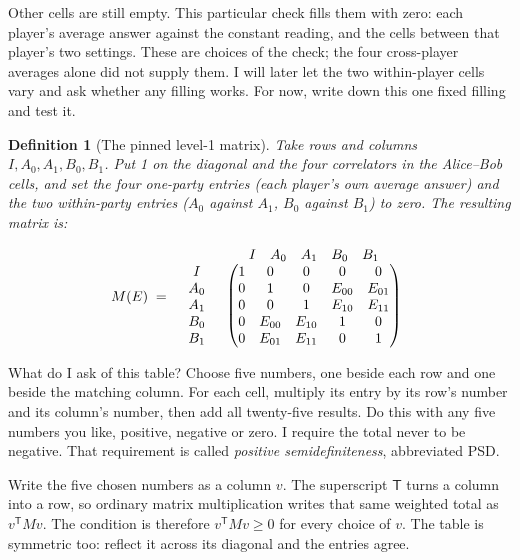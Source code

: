 \documentclass[11pt,twoside]{article}
\theoremstyle{thielethm}
\theoremstyle{thieledef}
\newtheorem{definition}{Definition}[section]
\theoremstyle{thieledef}
\theoremstyle{thieledef}
\theoremstyle{thielethm}
\theoremstyle{thieleobs}
\theoremstyle{thielethm}
\begin{document}
Other cells are still empty. This particular check fills them with zero:
each player's average answer against the constant reading, and the cells
between that player's two settings. These are choices of the check; the
four cross-player averages alone did not supply them. I will later let the
two within-player cells vary and ask whether any filling works. For now,
write down this one fixed filling and test it.

\begin{definition}[The pinned level-1 matrix]
Take rows and columns $I,A_0,A_1,B_0,B_1$. Put 1 on the diagonal and the four correlators in
the Alice--Bob cells, and set the four one-party entries (each player's own average answer) and
the two within-party entries ($A_0$ against $A_1$, $B_0$ against $B_1$) to zero. The resulting
matrix is:
\end{definition}

\[
M(E) \;=\;
\begin{array}{c@{\quad}c}
 & \begin{array}{ccccc} I & A_0 & A_1 & B_0 & B_1 \end{array} \\
\begin{array}{c} I \\ A_0 \\ A_1 \\ B_0 \\ B_1 \end{array} &
\begin{pmatrix}
1 & 0 & 0 & 0 & 0 \\
0 & 1 & 0 & E_{00} & E_{01} \\
0 & 0 & 1 & E_{10} & E_{11} \\
0 & E_{00} & E_{10} & 1 & 0 \\
0 & E_{01} & E_{11} & 0 & 1
\end{pmatrix}
\end{array}
\]

What do I ask of this table? Choose five numbers, one beside each row and
one beside the matching column. For each cell, multiply its entry by its row's
number and its column's number, then add all twenty-five results. Do this
with any five numbers you like, positive, negative or zero. I require the
total never to be negative. That requirement is called \emph{positive
semidefiniteness}, abbreviated PSD.

Write the five chosen numbers as a column $v$. The superscript $\mathsf T$
turns a column into a row, so ordinary matrix multiplication writes that same
weighted total as $v^{\mathsf T}Mv$. The condition is therefore
$v^{\mathsf T}Mv\ge0$ for every choice of $v$. The table is symmetric too:
reflect it across its diagonal and the entries agree.
\end{document}
